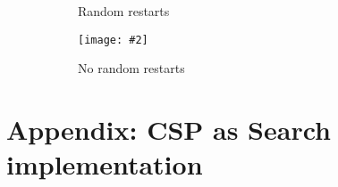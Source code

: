 \documentclass{article}
\newcommand{\centerfig}[2]{\begin{center}\texttt{[image: \#2]}\end{center}}
\begin{document}
\begin{enumerate}[label=(\alph*)]
\begin{center}
\begin{figure}[htp]
\begin{subfigure}[b]{0.5\textwidth}
{                \begin{center}
                    Random restarts
                \end{center}
            }
        \end{subfigure}
        \begin{subfigure}[b]{0.5\textwidth} \color{ans}
            \centerfig{1}{../figs/q4_c_5.png}{
                \begin{center}
                    No random restarts
                \end{center}
            }
        \end{subfigure}
        \end{figure}
    \end{center}
\end{enumerate}

\clearpage
\appendix

\section{Appendix: CSP as Search implementation}
\label{appendix:CSP Search}
\begin{center}
    
\end{center}
\end{document}
